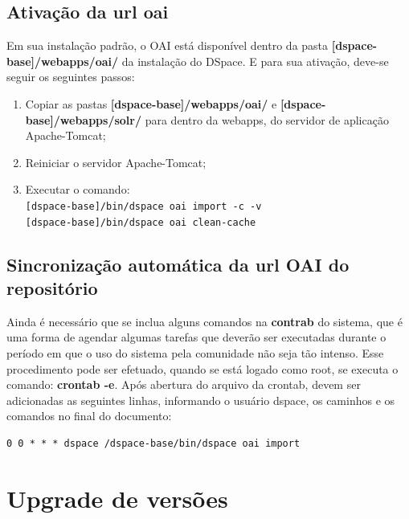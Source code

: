 \documentclass[12pt,hidelinks]{article}
\begin{document}
    \subsection{Ativação da url oai}
   
    Em sua instalação padrão, o OAI está disponível dentro da pasta \textbf{[dspace-base]/webapps/oai/} da instalação do DSpace. E para sua ativação, deve-se seguir os seguintes passos:
        
        
        \begin{enumerate}
            \item Copiar as pastas \textbf{[dspace-base]/webapps/oai/} e \textbf{[dspace-base]/webapps/solr/} para dentro da webapps, do servidor de aplicação Apache-Tomcat;
            
            \item Reiniciar o servidor Apache-Tomcat;
            
            \item Executar o comando:\\
             \texttt{[dspace-base]/bin/dspace oai import -c -v}\\
             \texttt{[dspace-base]/bin/dspace oai clean-cache}

        \end{enumerate}
        
\newpage
    \subsection{Sincronização automática da url OAI do repositório}
    Ainda é necessário que se inclua alguns comandos na \textbf{contrab} do sistema, que é uma forma de agendar algumas tarefas que deverão ser executadas durante o período em que o uso do sistema pela comunidade não seja tão intenso. Esse procedimento pode ser efetuado, quando se está logado como root, se executa o comando: \textbf{crontab -e}. Após abertura do arquivo da crontab, devem ser adicionadas as seguintes linhas, informando o usuário dspace, os caminhos e os comandos no final do documento:
    
    \begin{verbatim}
0 0 * * * dspace /dspace-base/bin/dspace oai import
    \end{verbatim}

\newpage

\section{Upgrade de versões}
\newpage
\end{document}
